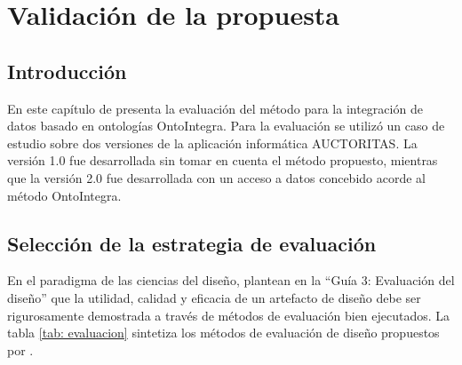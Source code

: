 \chapter{\large Validación de la propuesta}\label{Capítulo 3}

\pagestyle{fancy}
\lhead{}
\chead{}
\lfoot{}
\cfoot{}
\rfoot{\thepage}
\renewcommand{\headrulewidth}{0.4pt}
\vspace{-1cm}

\section{Introducción}
En este capítulo de presenta la evaluación del método para la integración de datos basado en ontologías OntoIntegra. Para la evaluación se utilizó un caso de estudio sobre dos versiones de la aplicación informática AUCTORITAS. La versión 1.0 fue desarrollada sin tomar en cuenta el método propuesto, mientras que la versión 2.0 fue desarrollada con un acceso a datos concebido acorde al método OntoIntegra.

\section{Selección de la estrategia de evaluación}
En el paradigma de las ciencias del diseño,\cite{Hevner:2004:DSI:2017212.2017217} plantean en la ``Guía 3: Evaluación del diseño'' que la utilidad, calidad y eficacia de un artefacto de diseño debe ser rigurosamente demostrada a través de métodos de evaluación bien ejecutados. La tabla \ref{tab: evaluacion} sintetiza los métodos de evaluación de diseño propuestos por \citep{Hevner:2004:DSI:2017212.2017217}.

